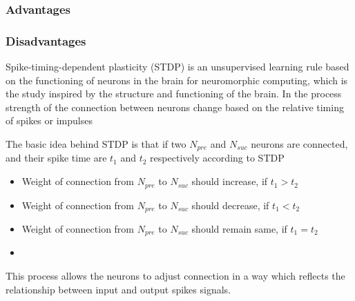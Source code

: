\subsubsection{Advantages}
\subsubsection{Disadvantages}
Spike-timing-dependent plasticity (STDP)\cite{stdp} is an unsupervised learning
rule based on the functioning of neurons in the brain for neuromorphic
computing, which is the study inspired by the structure and functioning of the
brain. In the process strength of the connection between neurons change based
on the relative timing of spikes or impulses

The basic idea behind STDP is that if two $N_{pre}$ and $N_{suc}$ neurons are
connected, and their spike time are $t_1$ and $t_2$ respectively according to
STDP \vspace*{-.3pc}
\begin{itemize}
    \item[]Weight of connection from $N_{pre}$ to $N_{suc}$ should  increase, if {\boldmath$t_1>t_2$}
    \item[]Weight of connection from $N_{pre}$ to $N_{suc}$ should  decrease, if {\boldmath$t_1<t_2$}
    \item[]Weight of connection from $N_{pre}$ to $N_{suc}$ should  remain same, if {\boldmath$t_1=t_2$}
    \item[]
\end{itemize}
\vspace*{-2.5pc}
This process allows the neurons to adjust connection in a way which reflects
the relationship between input and output spikes signals.